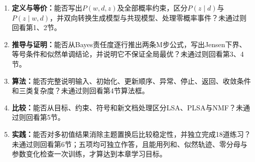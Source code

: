 \begin{SLCompactClosure}
\label{struct:V4-C06-CH36}

\label{struct:V4-C06-CH37}
\begin{selfcheckbox}
\begin{enumerate}[leftmargin=2.2em]
  \item \textbf{定义与等价：}能否写出$P(w,d,z)$及全部概率约束，区分$P(z\mid d)$与$P(z\mid w,d)$，并双向转换生成模型与共现模型、处理零概率事件？未通过则回看第1、2节。
  \item \textbf{推导与证明：}能否从Bayes责任度逐行推出两条M步公式，写出Jensen下界、等号条件和似然单调结论，并说明它不保证全局最优？未通过则回看第3、4节。
  \item \textbf{算法：}能否完整说明输入、初始化、更新顺序、异常、停止、返回、收敛条件和三类复杂度？未通过则回看第4节算法框。
  \item \textbf{比较：}能否从目标、约束、符号和新文档处理区分LSA、PLSA与NMF？未通过则回看第5节。
  \item \textbf{实践：}能否对多初值结果消除主题置换后比较稳定性，并独立完成18道练习？未通过则回看第6节；五项均可独立作答，且能用列和、似然轨迹、零分母与参数变化检查一次训练，才算达到本章学习目标。
\end{enumerate}
\end{selfcheckbox}
\end{SLCompactClosure}
